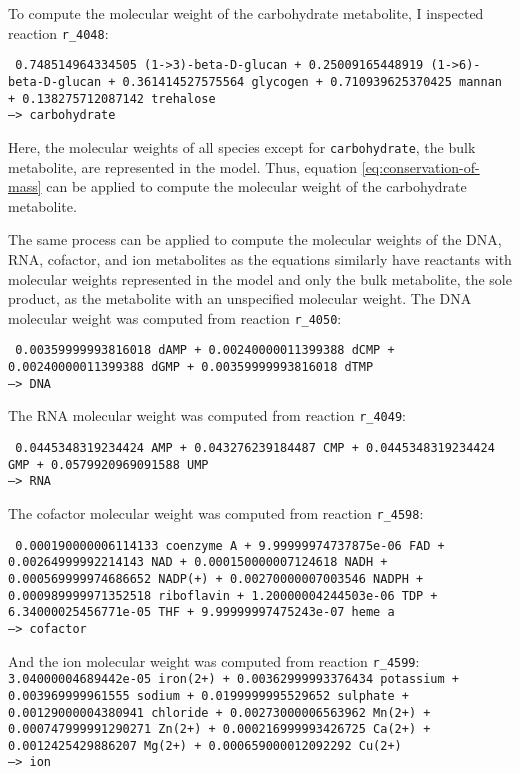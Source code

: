 To compute the molecular weight of the carbohydrate metabolite, I inspected reaction \texttt{r\_4048}:

\texttt{
  0.748514964334505 (1->3)-beta-D-glucan + 0.25009165448919 (1->6)-beta-D-glucan + 0.361414527575564 glycogen + 0.710939625370425 mannan + 0.138275712087142 trehalose \\
  --> carbohydrate
}

Here, the molecular weights of all species except for \texttt{carbohydrate}, the bulk metabolite, are represented in the model.
Thus, equation \ref{eq:conservation-of-mass} can be applied to compute the molecular weight of the carbohydrate metabolite.

The same process can be applied to compute the molecular weights of the DNA, RNA, cofactor, and ion metabolites as the equations similarly have reactants with molecular weights represented in the model and only the bulk metabolite, the sole product, as the metabolite with an unspecified molecular weight.
The DNA molecular weight was computed from reaction \texttt{r\_4050}:

\texttt{
  0.00359999993816018 dAMP + 0.00240000011399388 dCMP + 0.00240000011399388 dGMP + 0.00359999993816018 dTMP
  \\ --> DNA
}

The RNA molecular weight was computed from reaction \texttt{r\_4049}:

\texttt{
  0.0445348319234424 AMP + 0.043276239184487 CMP + 0.0445348319234424 GMP + 0.0579920969091588 UMP
  \\ --> RNA
}

The cofactor molecular weight was computed from reaction \texttt{r\_4598}:

\texttt{
  0.000190000006114133 coenzyme A + 9.99999974737875e-06 FAD + 0.00264999992214143 NAD + 0.000150000007124618 NADH + 0.000569999974686652 NADP(+) + 0.00270000007003546 NADPH + 0.000989999971352518 riboflavin + 1.20000004244503e-06 TDP + 6.34000025456771e-05 THF + 9.99999997475243e-07 heme a
  \\ --> cofactor
}

And the ion molecular weight was computed from reaction \texttt{r\_4599}:
\texttt{
    3.04000004689442e-05 iron(2+) + 0.00362999993376434 potassium + 0.003969999961555 sodium + 0.0199999995529652 sulphate + 0.00129000004380941 chloride + 0.00273000006563962 Mn(2+) + 0.000747999991290271 Zn(2+) + 0.000216999993426725 Ca(2+) + 0.0012425429886207 Mg(2+) + 0.000659000012092292 Cu(2+)
    \\ --> ion
}

